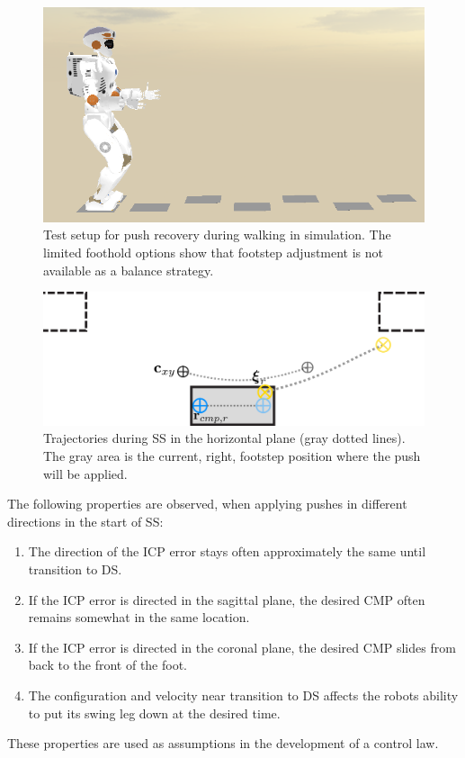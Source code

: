 \begin{figure}[h]
\centering
  \includegraphics[width=.8\linewidth]{STYLESTUFF/valwalkingtest.png}
   \caption{Test setup for push recovery during walking in simulation. The limited foothold options show that footstep adjustment is not available as a balance strategy.}
    \label{fig:valwalkingtest}
\end{figure}
\begin{figure}[h]
\centering
  \includegraphics[width=.8\linewidth]{STYLESTUFF/ICPplan3StepComICPrSS.png}
   \caption{Trajectories during \ac{SS} in the horizontal plane (gray dotted lines). The gray area is the current, right, footstep position where the push will be applied.}
    \label{fig:3foot}
\end{figure}

The following properties are observed, when applying pushes in different directions in the start of \ac{SS}:
\begin{enumerate}
	\item The direction of the \ac{ICP} error stays often approximately the same until transition to \ac{DS}.
	\item If the \ac{ICP} error is directed in the sagittal plane, the desired \ac{CMP} often remains somewhat in the same location.
	\item If the \ac{ICP} error is directed  in the coronal plane, the desired \ac{CMP} slides from back to the front of the foot.
	\item The configuration and velocity near transition to \ac{DS} affects the robots ability to put its swing leg down at the desired time. 
\end{enumerate}
These properties are used as assumptions in the development of a control law.
